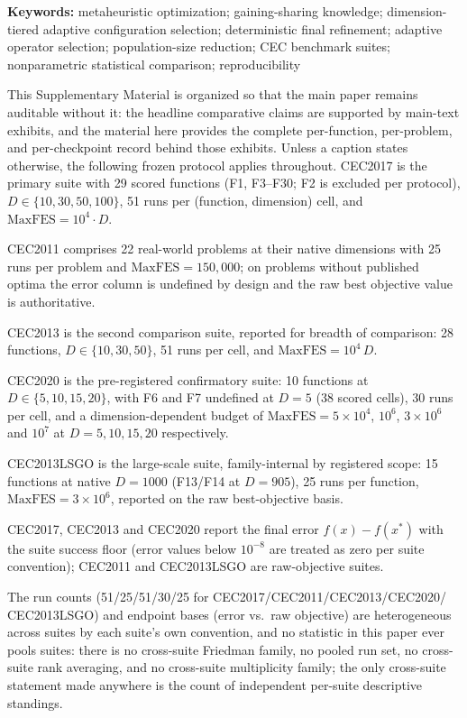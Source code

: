 \documentclass[10pt,a4paper]{article}
\begin{document}
\noindent\textbf{Keywords:} metaheuristic optimization;
gaining-sharing knowledge;
dimension-tiered adaptive configuration selection;
deterministic final refinement;
adaptive operator selection;
population-size reduction;
CEC benchmark suites;
nonparametric statistical comparison;
reproducibility

\noindent This Supplementary Material is organized so that the main paper
remains auditable without it: the headline comparative claims are supported
by main-text exhibits, and the material here provides the complete
per-function, per-problem, and per-checkpoint record behind those
exhibits.  Unless a caption states otherwise, the following frozen
protocol applies throughout.
CEC2017 is the primary suite with 29 scored functions (F1, F3--F30; F2 is
excluded per protocol), $D \in \{10, 30, 50, 100\}$, 51 runs per
(function, dimension) cell, and $\mathrm{MaxFES} = 10^{4} \cdot D$.

CEC2011 comprises 22 real-world problems at their native dimensions with
25 runs per problem and $\mathrm{MaxFES} = 150{,}000$; on problems without
published optima the error column is undefined by design and the raw best
objective value is authoritative.

CEC2013 is the second comparison suite, reported for breadth of
comparison: 28 functions, $D \in \{10, 30, 50\}$, 51 runs per
cell, and $\mathrm{MaxFES} = 10^{4}\,D$.

CEC2020 is the pre-registered confirmatory suite: 10 functions at
$D \in \{5, 10, 15, 20\}$, with F6 and F7 undefined at $D = 5$ (38 scored
cells), 30 runs per cell, and a dimension-dependent budget of
$\mathrm{MaxFES} = 5 \times 10^{4}$, $10^{6}$, $3 \times 10^{6}$ and
$10^{7}$ at $D = 5, 10, 15, 20$ respectively.

CEC2013LSGO is the large-scale suite, family-internal by registered scope:
15 functions at native $D = 1000$ (F13/F14 at $D = 905$), 25 runs per
function, $\mathrm{MaxFES} = 3 \times 10^{6}$, reported on the raw
best-objective basis.

CEC2017, CEC2013 and CEC2020 report the final error $f(x) - f(x^{*})$ with
the suite success floor (error values below $10^{-8}$ are treated as zero
per suite convention); CEC2011 and CEC2013LSGO are raw-objective suites.

The run counts (51/25/51/30/25 for CEC2017/CEC2011/CEC2013/CEC2020/
CEC2013LSGO) and endpoint bases (error vs.\ raw objective) are
heterogeneous across suites by each suite's own convention, and no
statistic in this paper ever pools suites: there is no cross-suite
Friedman family, no pooled run set, no cross-suite rank averaging, and no
cross-suite multiplicity family; the only cross-suite statement made
anywhere is the count of independent per-suite descriptive standings.
\end{document}
